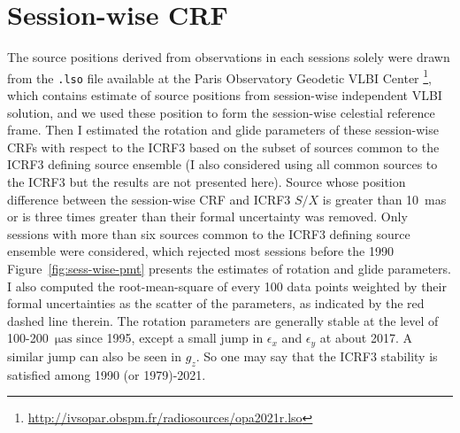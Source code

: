\documentclass{aa-note}    %
\begin{document}
\section{Session-wise CRF}    \label{sec:computations}


The source positions derived from observations in each sessions solely were
drawn from the \texttt{.lso} file available at the Paris Observatory Geodetic VLBI Center 
\footnote{\url{http://ivsopar.obspm.fr/radiosources/opa2021r.lso}}, which contains estimate of 
source positions from session-wise independent VLBI solution, and we used 
these position to form the session-wise celestial reference frame.
Then I estimated the rotation and glide parameters of these session-wise CRFs with respect to 
the ICRF3 based on the subset of sources common to the ICRF3 defining source ensemble
(I also considered using all common sources to the ICRF3 but the results are not presented here).
Source whose position difference between the session-wise CRF and ICRF3 $S/X$ is greater than 10~mas 
or is three times greater than their formal uncertainty was removed.
Only sessions with more than six sources common to the ICRF3 defining source ensemble were considered, 
which rejected most sessions before the 1990
Figure~\ref{fig:sess-wise-pmt} presents the estimates of rotation and glide parameters.
I also computed the root-mean-square of every 100 data points weighted by their formal uncertainties 
as the scatter of the parameters, as indicated by the red dashed line therein.
The rotation parameters are generally stable at the level of 100-200~$\mathrm{\mu as}$ since 1995, except a small jump in $\epsilon_x$ and $\epsilon_y$ at about 2017.
A similar jump can also be seen in $g_z$.
So one may say that the ICRF3 stability is satisfied among 1990 (or 1979)-2021.
\end{document}
